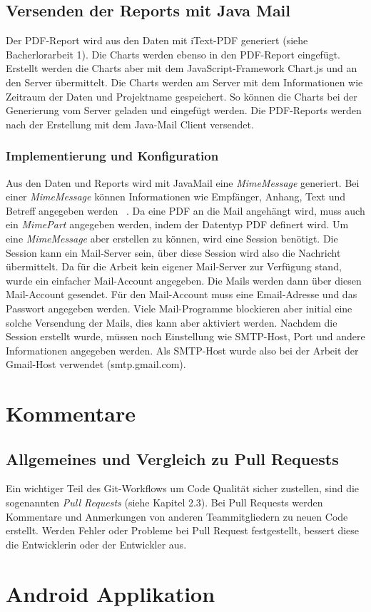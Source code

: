 \subsection{Versenden der Reports mit Java Mail}
Der PDF-Report wird aus den Daten mit iText-PDF generiert (siehe Bacherlorarbeit 1). Die Charts werden ebenso in den PDF-Report eingefügt. Erstellt werden die Charts aber mit dem JavaScript-Framework Chart.js und an den Server übermittelt. Die Charts werden am Server mit dem Informationen wie Zeitraum der Daten und Projektname gespeichert. So können die Charts bei der Generierung vom Server geladen und eingefügt werden. Die PDF-Reports werden nach der Erstellung mit dem Java-Mail Client versendet. 
\subsubsection{Implementierung und Konfiguration} 
Aus den Daten und Reports wird mit JavaMail eine \textit{MimeMessage} generiert. Bei einer \textit{MimeMessage} können Informationen wie Empfänger, Anhang, Text und Betreff angegeben werden ~\parencite{harold2013javamail}. Da eine PDF an die Mail angehängt wird, muss auch ein \textit{MimePart} angegeben werden, indem der Datentyp PDF definert wird. Um eine \textit{MimeMessage} aber erstellen zu können, wird eine Session benötigt. Die Session kann ein Mail-Server sein, über diese Session wird also die Nachricht übermittelt. Da für die Arbeit kein eigener Mail-Server zur Verfügung stand, wurde ein einfacher Mail-Account angegeben. Die Mails werden dann über diesen Mail-Account gesendet. Für den Mail-Account muss eine Email-Adresse und das Passwort angegeben werden. Viele Mail-Programme blockieren aber initial eine solche Versendung der Mails, dies kann aber aktiviert werden. Nachdem die Session erstellt wurde, müssen noch Einstellung wie SMTP-Host, Port und andere Informationen angegeben werden. Als SMTP-Host wurde also bei der Arbeit der Gmail-Host verwendet (smtp.gmail.com). 
\section{Kommentare}
\subsection{Allgemeines und Vergleich zu Pull Requests}
Ein wichtiger Teil des Git-Workflows um Code Qualität sicher zustellen, sind die sogenannten \textit{Pull Requests} (siehe Kapitel 2.3). Bei Pull Requests werden Kommentare und Anmerkungen von anderen Teammitgliedern zu neuen Code erstellt. Werden Fehler oder Probleme bei Pull Request festgestellt, bessert diese die Entwicklerin oder der Entwickler aus.
\section{Android Applikation}
\chapterend